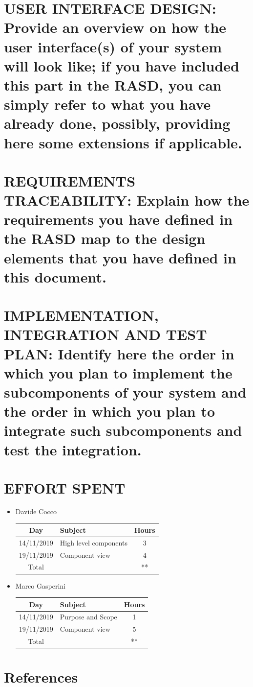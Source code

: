 \documentclass[12pt,a4paper]{article}
\begin{document}
\section{USER INTERFACE DESIGN: Provide an overview on how the user interface(s) of your system will look like; if you have included this part in the RASD, you can simply refer to what you have already done, possibly, providing here some extensions if applicable.}
\section{REQUIREMENTS TRACEABILITY: Explain how the requirements you have defined in the RASD map to the design elements that you have defined in this document.}
\section{IMPLEMENTATION, INTEGRATION AND TEST PLAN: Identify here the order in which you plan to implement the subcomponents of your system and the order in which you plan to integrate such subcomponents and test the integration.}
\section{EFFORT SPENT}
\begin{itemize}
\item {Davide Cocco}
 \begin{center}
			\begin{tabular}{| c | l | c |}
				\hline
				\textbf{Day} & \textbf{Subject} & \textbf{Hours} \\ \hline
				14/11/2019 & High level components & 3 \\ \hline
				19/11/2019 & Component view & 4 \\ \hline
				Total & & ** \\ \hline
			\end{tabular}
		\end{center}
\item {Marco Gasperini}
\begin{center}
			\begin{tabular}{| c | l | c |}
				\hline
				\textbf{Day} & \textbf{Subject} & \textbf{Hours} \\ \hline
				14/11/2019 & Purpose and Scope & 1 \\ \hline
				19/11/2019 & Component view & 5 \\ \hline
				Total & & ** \\ \hline
			\end{tabular}
\end{center}
\end{itemize}
\section{References}
\end{document}
